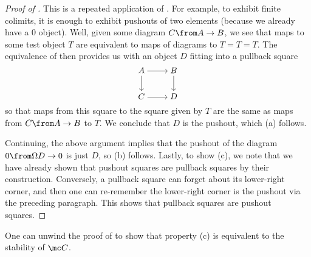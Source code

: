 \documentclass[../notes.tex]{subfiles}
\begin{document}
\begin{proof}[Proof of ]
	This is a repeated application of . For example, to exhibit finite colimits, it is enough to exhibit pushouts of two elements (because we already have a $0$ object). Well, given some diagram $C\from A\to B$, we see that maps to some test object $T$ are equivalent to maps of diagrams to $T=T=T$. The equivalence of  then provides us with an object $D$ fitting into a pullback square
	\[\begin{tikzcd}[cramped]
		A & B \\
		C & D
		\arrow[from=1-1, to=1-2]
		\arrow[from=1-1, to=2-1]
		\arrow[from=1-2, to=2-2]
		\arrow[from=2-1, to=2-2]
	\end{tikzcd}\]
	so that maps from this square to the square given by $T$ are the same as maps from $C\from A\to B$ to $T$. We conclude that $D$ is the pushout, which (a) follows.
	
	Continuing, the above argument implies that the pushout of the diagram $0\from\Omega D\to0$ is just $D$, so (b) follows. Lastly, to show (c), we note that we have already shown that pushout squares are pullback squares by their construction. Conversely, a pullback square can forget about its lower-right corner, and then one can re-remember the lower-right corner is the pushout via the preceding paragraph. This shows that pullback squares are pushout squares.
\end{proof}
\begin{remark}
	One can unwind the proof of  to show that property (c) is equivalent to the stability of $\mc C$.
\end{remark}
\end{document}
